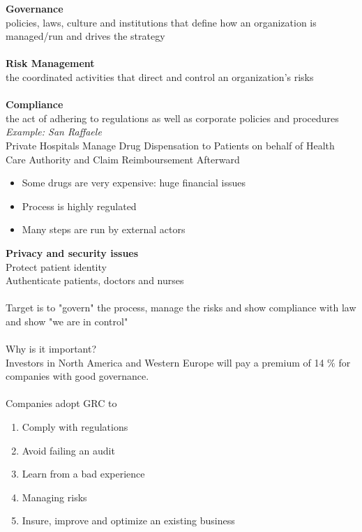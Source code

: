 \documentclass[10pt,a4paper]{book}
\begin{document}
\textbf{Governance}\\
policies, laws, culture and institutions that define how an organization is managed/run and drives the strategy\\\\
\textbf{Risk Management}\\
the coordinated activities that direct and control an organization's risks\\\\
\textbf{Compliance}\\
the act of adhering to regulations as well as corporate policies and procedures
\newpage
\emph{Example: San Raffaele}\\
Private Hospitals Manage Drug Dispensation to Patients on behalf of Health Care Authority and Claim Reimboursement Afterward
\begin{itemize}
\item Some drugs are very expensive: huge financial issues 
\item Process is highly regulated 
\item Many steps are run by external actors
\end{itemize}
\textbf{Privacy and security issues}\\
Protect patient identity \\
Authenticate patients, doctors and nurses\\\\
Target is to "govern" the process, manage the risks and show compliance with law and show "we are in control"\\\\
Why is it important?\\
Investors in North America and Western Europe will pay a premium of 14 $\%$ for companies with good governance.\\\\
Companies adopt GRC to
\begin{enumerate}
\item Comply with regulations 
\item Avoid failing an audit 
\item Learn from a bad experience 
\item Managing risks 
\item Insure, improve and optimize an existing business
\end{enumerate}
\newpage
\end{document}
